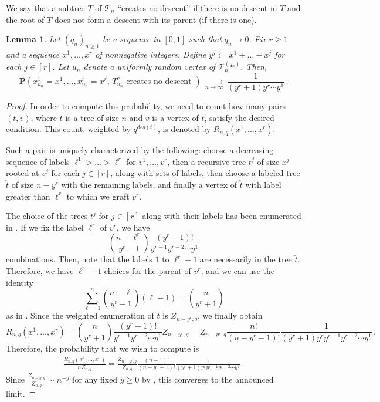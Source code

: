 \documentclass{article}
\newtheorem{lemma}[theorem]{Lemma}
\theoremstyle{remark}
\newcommand{\cv}[1]{\,\underset{#1}{\longrightarrow}\,}
\newcommand{\cT}{\mathcal{T}}
\newcommand{\prob}[1]{\mathbf{P}{\left(#1\right)}}
\newcommand{\des}[1]{{\mathrm{des}{\left(#1\right)}}}
\begin{document}
We say that a subtree $T$ of $\cT_n$ \enquote{creates no descent} if there is no descent in $T$ and the root of $T$ does not form a descent with its parent (if there is one).

\begin{lemma}\label{lem: local limit when no descent and q to 0}
    Let $(q_n)_{n\ge1}$ be a sequence in $[0,1]$ such that $q_n \to 0$.
    Fix $r\ge1$ and a sequence $x^1, \dots, x^r$ of nonnegative integers.
    Define $y^j := x^1+\dots+x^j$ for each $j\in [r]$.
    Let $u_n$ denote a uniformly random vertex of $\cT_n^{(q_n)}$.
    Then,
    \[
    \prob{ x_{u_n}^1 = x^1 , \dots , x_{u_n}^r = x^r ,\, T_{u_n}^r \text{ creates no descent } }
    \cv{n\to\infty} \frac{1}{(y^r+1) y^r \cdots y^1} \,.
    \]
\end{lemma}

\begin{proof}
    In order to compute this probability, we need to count how many pairs $(t,v)$, where $t$ is a tree of size $n$ and $v$ is a vertex of $t$, satisfy the desired condition.
    This count, weighted by $q^\des{t}$, is denoted by $R_{n,q}\left( x^1,\dots,x^r \right)$.

    Such a pair is uniquely characterized by the following:
    choose a decreasing sequence of labels $\ell^1 > \dots > \ell^r$ for $v^1, \dots, v^r$, then a recursive tree $t^j$ of size $x^j$ rooted at $v^j$ for each $j\in[r]$, along with sets of labels, then choose a labeled tree $\check t$ of size $n-y^r$ with the remaining labels, and finally a vertex of $\check t$ with label greater than $\ell^r$ to which we graft $v^r$.

    The choice of the trees $t^j$ for $j\in[r]$ along with their labels has been enumerated in \cite[Appendix~A]{Dadedzi_Wagner_2024}.
    If we fix the label $\ell^r$ of $v^r$, we have
    \[
    \binom{n-\ell^r}{y^r-1} \frac{(y^r-1)!}{y^{r-1} y^{r-2} \cdots y^1} 
    \]
    combinations.
    Then, note that the labels $1$ to $\ell^r-1$ are necessarily in the tree $\check t$.
    Therefore, we have $\ell^r-1$ choices for the parent of $v^r$, and we can use the identity
    \[
    \sum_{\ell=1}^n \binom{n-\ell}{y^r-1} (\ell-1) = \binom{n}{y^r+1}
    \]
    as in \cite{Dadedzi_Wagner_2024}.
    Since the weighted enumeration of $\check t$ is $Z_{n-y^r,q}$, we finally obtain
    \[
    R_{n,q}\left( x^1,\dots,x^r \right) 
    = \binom{n}{y^r+1} \frac{(y^r-1)!}{y^{r-1} y^{r-2} \cdots y^1} Z_{n-y^r,q}   
    = Z_{n-y^r,q} \frac{n!}{(n-y^r-1)!} \frac{1}{(y^r+1) y^r y^{r-1} y^{r-2} \cdots y^1} \,.
    \]
Therefore, the probability that we wish to compute is
\begin{align*}
    \frac{R_{n,q}\left( x^1,\dots,x^r \right)}{n Z_{n,q}}
    = \frac{Z_{n-y^r,q}}{Z_{n,q}} \frac{(n-1)!}{(n-y^r-1)!} \frac{1}{(y^r+1) y^r y^{r-1} y^{r-2} \cdots y^1} \,.
\end{align*}
Since $\frac{Z_{n-y,q}}{Z_{n,q}} \sim n^{-y}$ for any fixed $y\ge0$ by , this converges to the announced limit.
\end{proof}
\end{document}
